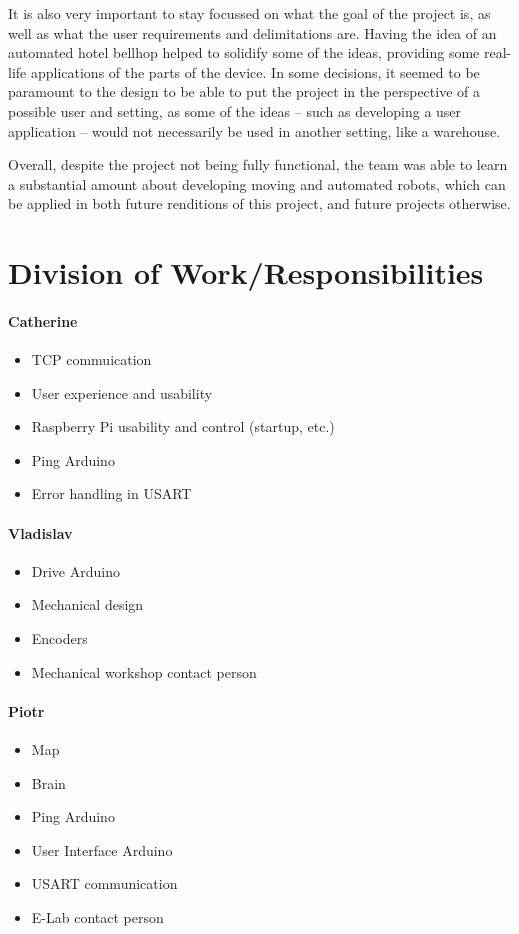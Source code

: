 \documentclass[11pt]{article}
\begin{document}
It is also very important to stay focussed on what the goal of the project is, as well as what the user requirements and delimitations are. Having the idea of an automated hotel bellhop helped to solidify some of the ideas, providing some real-life applications of the parts of the device. In some decisions, it seemed to be paramount to the design to be able to put the project in the perspective of a possible user and setting, as some of the ideas -- such as developing a user application -- would not necessarily be used in another setting, like a warehouse.

Overall, despite the project not being fully functional, the team was able to learn a substantial amount about developing moving and automated robots, which can be applied in both future renditions of this project, and future projects otherwise.
\newpage
\section{Division of Work/Responsibilities}
\paragraph{Catherine}
\begin{itemize}
\item{TCP commuication}
\item{User experience and usability}
\item{Raspberry Pi usability and control (startup, etc.)}
\item{Ping Arduino}
\item{Error handling in USART}
\end{itemize}
\paragraph{Vladislav}
\begin{itemize}
\item{Drive Arduino}
\item{Mechanical design}
\item{Encoders}
\item{Mechanical workshop contact person}
\end{itemize}
\paragraph{Piotr}
\begin{itemize}
\item{Map}
\item{Brain}
\item{Ping Arduino}
\item{User Interface Arduino}
\item{USART communication}
\item{E-Lab contact person}
\end{itemize}
\end{document}
